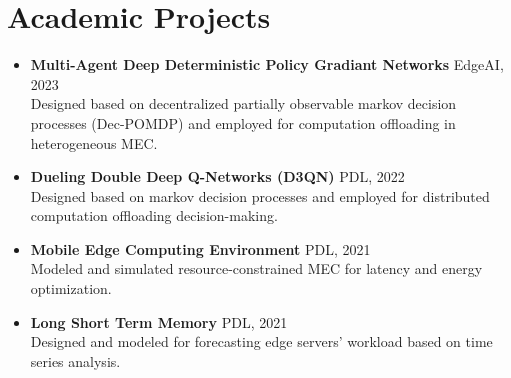 \documentclass[11pt]{article}
\begin{document}
\section{Academic Projects}

\begin{itemize}
	

		
	
	
	\item \textbf{Multi-Agent Deep Deterministic Policy Gradiant Networks} \hfill EdgeAI, 2023\\
	Designed based on decentralized partially observable markov decision processes (Dec-POMDP) and employed for computation offloading in heterogeneous MEC.
	
	
	
	\item \textbf{Dueling Double Deep Q-Networks (D3QN)} \hfill PDL, 2022\\
     Designed based on markov decision processes and employed for distributed computation offloading decision-making. \href{https://github.com/ImanRHT/QECO}{\faGithub} %
	
	
	\item \textbf{Mobile Edge Computing Environment} \hfill PDL, 2021\\
	Modeled and simulated resource-constrained MEC for latency and energy optimization. \href{https://github.com/ImanRHT/MEC_Environment}{\faGithub} %
	

	
	\item \textbf{Long Short Term Memory} \hfill PDL, 2021\\
	Designed and modeled for forecasting edge servers' workload based on time series analysis.
	

\end{itemize}
\end{document}
